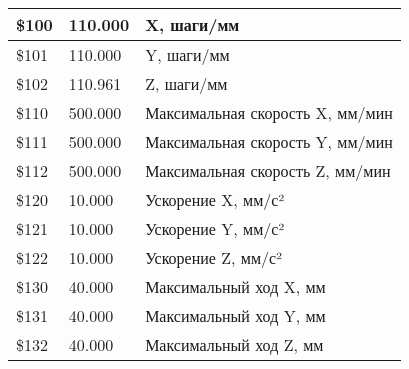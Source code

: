 \begin{table}[h!]
\begin{tabular}{|l|l|l|}
        \hline
        \$100 & 110.000 & X, шаги/мм \\
        \hline
        \$101 & 110.000 & Y, шаги/мм \\
        \hline
        \$102 & 110.961 & Z, шаги/мм \\
        \hline
        \$110 & 500.000 & Максимальная скорость X, мм/мин \\
        \hline
        \$111 & 500.000 & Максимальная скорость Y, мм/мин \\
        \hline
        \$112 & 500.000 & Максимальная скорость Z, мм/мин \\
        \hline
        \$120 & 10.000 & Ускорение X, мм/с² \\
        \hline
        \$121 & 10.000 & Ускорение Y, мм/с² \\
        \hline
        \$122 & 10.000 & Ускорение Z, мм/с² \\
        \hline
        \$130 & 40.000 & Максимальный ход X, мм \\
        \hline
        \$131 & 40.000 & Максимальный ход Y, мм \\
        \hline
        \$132 & 40.000 & Максимальный ход Z, мм \\
        \hline
    \end{tabular}
\end{table}
